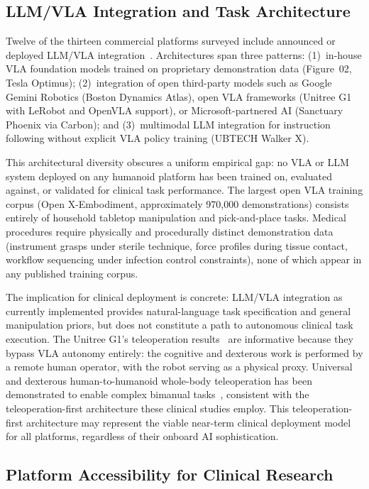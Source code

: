 \documentclass[acmsmall]{acmart}
\begin{document}
\subsection{LLM/VLA Integration and Task Architecture}
\label{sec:llmvla}

Twelve of the thirteen commercial platforms surveyed include announced or
deployed LLM/VLA integration~\cite{cao2025humanoid}. Architectures span three
patterns: (1)~in-house VLA foundation models trained on proprietary demonstration
data (Figure~02, Tesla Optimus); (2)~integration of open third-party models such
as Google Gemini Robotics (Boston Dynamics Atlas), open VLA frameworks
(Unitree G1 with LeRobot and OpenVLA support), or Microsoft-partnered AI
(Sanctuary Phoenix via Carbon); and (3)~multimodal LLM integration for
instruction following without explicit VLA policy training (UBTECH Walker X).

This architectural diversity obscures a uniform empirical gap: no VLA or LLM
system deployed on any humanoid platform has been trained on, evaluated against,
or validated for clinical task performance. The largest open VLA training corpus
(Open X-Embodiment, approximately 970,000 demonstrations) consists entirely of
household tabletop manipulation and pick-and-place tasks. Medical procedures
require physically and procedurally distinct demonstration data (instrument
grasps under sterile technique, force profiles during tissue contact, workflow
sequencing under infection control constraints), none of which appear in any
published training corpus.

The implication for clinical deployment is concrete: LLM/VLA integration as
currently implemented provides natural-language task specification and general
manipulation priors, but does not constitute a path to autonomous clinical task
execution. The Unitree G1's teleoperation results~\cite{atar2025humanoids,cho2026humanoid}
are informative because they bypass VLA autonomy entirely: the
cognitive and dexterous work is performed by a remote human operator, with the
robot serving as a physical proxy. Universal and dexterous human-to-humanoid
whole-body teleoperation has been demonstrated to enable complex bimanual
tasks~\cite{he2024omnikh}, consistent with the teleoperation-first architecture
these clinical studies employ. This teleoperation-first architecture may
represent the viable near-term clinical deployment model for all platforms,
regardless of their onboard AI sophistication.

\subsection{Platform Accessibility for Clinical Research}
\label{sec:accessibility}
\end{document}
